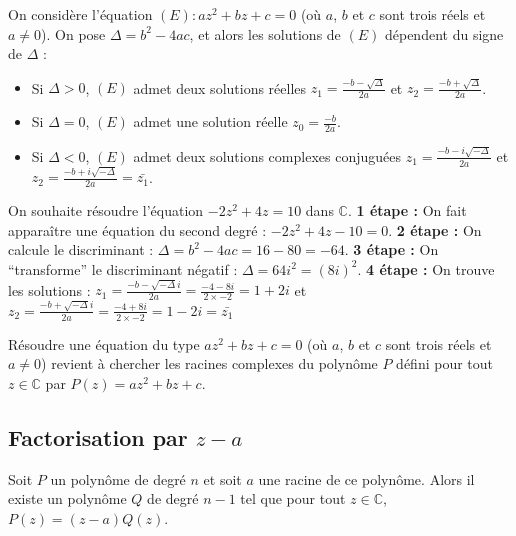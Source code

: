 	\begin{formula}
		On considère l'équation $(E) : az^2 + bz + c = 0$ (où $a$, $b$ et $c$ sont trois réels et $a \neq 0$). On pose $\Delta = b^2 - 4ac$, et alors les solutions de $(E)$ dépendent du signe de $\Delta$ :
		\begin{itemize}
			\item Si $\Delta > 0$, $(E)$ admet deux solutions réelles $z_1 = \frac{-b - \sqrt{\Delta}}{2a}$ et $z_2 = \frac{-b + \sqrt{\Delta}}{2a}$.
			\item Si $\Delta = 0$, $(E)$ admet une solution réelle $z_0 = \frac{-b}{2a}$.
			\item Si $\Delta < 0$, $(E)$ admet deux solutions complexes conjuguées $z_1 = \frac{-b - i\sqrt{-\Delta}}{2a}$ et $z_2 = \frac{-b + i\sqrt{-\Delta}}{2a} = \bar{z_1}$.
		\end{itemize}
	\end{formula}

	\begin{tip}[Exemple]
		On souhaite résoudre l'équation $-2z^2 + 4z = 10$ dans $\mathbb{C}$.
		\newpar
		\textbf{1\iere{} étape :} On fait apparaître une équation du second degré : $-2z^2 + 4z - 10 = 0$.
		\newpar
		\textbf{2\ieme{} étape :} On calcule le discriminant : $\Delta = b^2 - 4ac = 16 - 80 = -64$.
		\newpar
		\textbf{3\ieme{} étape :} On ``transforme'' le discriminant négatif : $\Delta = 64i^2 = (8i)^2$.
		\newpar
		\textbf{4\ieme{} étape :} On trouve les solutions :
		\newpar
		$z_1 = \frac{-b - \sqrt{-\Delta}i}{2a} = \frac{-4 - 8i}{2 \times -2} = 1 + 2i$ et $z_2 = \frac{-b + \sqrt{-\Delta}i}{2a} = \frac{-4 + 8i}{2 \times -2} = 1 - 2i = \bar{z_1}$
	\end{tip}

	\begin{tip}
		Résoudre une équation du type $az^2 + bz + c = 0$ (où $a$, $b$ et $c$ sont trois réels et $a \neq 0$) revient à chercher les racines complexes du polynôme $P$ défini pour tout $z \in \mathbb{C}$ par $P(z) = az^2 + bz + c$.
	\end{tip}

	\subsection{Factorisation par \texorpdfstring{$z-a$}{z-a}}

	\begin{formula}
		Soit $P$ un polynôme de degré $n$ et soit $a$ une racine de ce polynôme. Alors il existe un polynôme $Q$ de degré $n-1$ tel que pour tout $z \in \mathbb{C}$, $P(z) = (z-a)Q(z)$.
	\end{formula}


